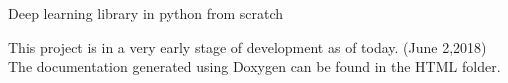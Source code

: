 Deep learning library in python from scratch

This project is in a very early stage of development as of today. (June 2,2018) The documentation generated using Doxygen can be found in the H\+T\+ML folder. 